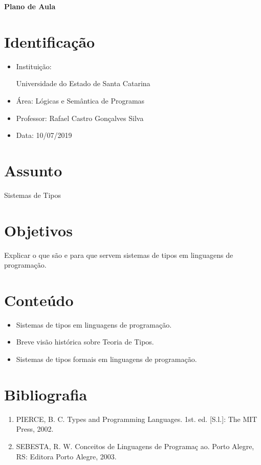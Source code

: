 \documentclass[11pt]{article}
\begin{document}
\begin{center}
  \LARGE\sf\bfseries Plano de Aula
\end{center}
\thispagestyle{empty}

\section{Identificação}

\begin{itemize}
\item Instituição: \parbox[t]{0.8\linewidth}{%
    Universidade do Estado de Santa Catarina}

\item Área: Lógicas e Semântica de Programas 

\item Professor: Rafael Castro Gonçalves Silva

\item Data: 10/07/2019

\end{itemize}

\section{Assunto}
\label{sec:assunto}

Sistemas de Tipos

\section{Objetivos}
\label{sec:objetivos}

Explicar o que são e para que servem sistemas de tipos em linguagens de programação.

\section{Conteúdo}
\label{sec:conteudo}

\begin{itemize}
  \item Sistemas de tipos em linguagens de programação.
  \item Breve visão histórica sobre Teoria de Tipos.
  \item Sistemas de tipos formais em linguagens de programação.
\end{itemize}

\section{Bibliografia}
\label{sec:bibliografia}

\begin{enumerate}
\item PIERCE, B. C. Types and Programming Languages. 1st. ed. [S.l.]: The MIT Press, 2002. 
\item SEBESTA, R. W. Conceitos de Linguagens de Programaç ao. Porto Alegre, RS: Editora Porto Alegre, 2003.
\end{enumerate}
\end{document}
